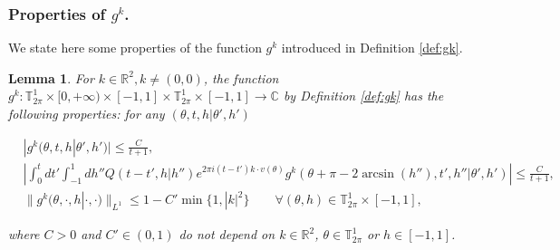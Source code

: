 \documentclass[a4paper,10pt,reqno]{amsart}
\newtheorem{lemma}{Lemma}[section]
\numberwithin{equation}{subsection}
\numberwithin{figure}{subsection}
\begin{document}
\subsubsection{Properties of $g^k$.}
We state here some properties of the function $g^k$ introduced in Definition \ref{def:gk}.
\begin{lemma}\label{lemma:proprgk}
For $k\in\mathbb{R}^2,k\neq(0,0)$, the function $g^k:\mathbb{T}^1_{2\pi}\times[0,+\infty)\times[-1,1]\times\mathbb{T}^1_{2\pi}\times[-1,1]\to\mathbb{C}$ by Definition \ref{def:gk} has the following properties: for any $(\theta,t,h|\theta',h')$

{\footnotesize\begin{align}
\label{decgk}&|g^k(\theta,t,h|\theta',h')|\leq\frac{C}{t+1},
\\
\label{decQgk}&\left|\int_0^tdt'\int_{-1}^1dh''Q(t-t',h|h'')e^{2\pi i(t-t')k\cdot v(\theta)}g^k(\theta+\pi-2\arcsin(h''),t',h''|\theta',h')\right|\leq\frac{C}{t+1},
\\
\label{gkint<1}&\|g^k(\theta,\cdot,h|\cdot,\cdot)\|_{L^1}\leq1-C'\min\{1,|k|^2\}\qquad\forall(\theta,h)\in\mathbb{T}^1_{2\pi}\times[-1,1],
\end{align}}

where $C>0$ and $C'\in(0,1)$ do not depend on $k\in\mathbb{R}^2$, $\theta\in\mathbb{T}^1_{2\pi}$ or $h\in[-1,1]$. 
\end{lemma}
\end{document}
